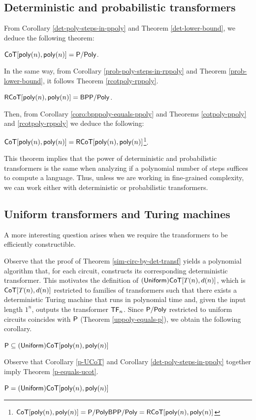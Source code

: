 \subsection{Deterministic and probabilistic transformers}

From Corollary \ref{det-poly-steps-in-ppoly} and Theorem \ref{det-lower-bound}, we deduce the following theorem:
%
\begin{theorem}\label{cotpoly-ppoly}
    $\mathsf{CoT}[\mathsf{poly}(n), \mathsf{poly}(n)] = \mathsf{P/Poly}$.
\end{theorem}
%
\noindent In the same way, from Corollary \ref{prob-poly-steps-in-rppoly} and Theorem \ref{prob-lower-bound}, it follows Theorem \ref{rcotpoly-rppoly}.
%
\begin{theorem}\label{rcotpoly-rppoly}
    $\mathsf{RCoT}[\mathsf{poly}(n), \mathsf{poly}(n)] = \mathsf{BPP/Poly}$.
\end{theorem}
%
\noindent Then, from Corollary \ref{coro:bpppoly-equals-ppoly} and Theorems \ref{cotpoly-ppoly} and \ref{rcotpoly-rppoly} we deduce the following:
%
\begin{theorem}\label{cotpoly-equals-rcotpoly}
    $\mathsf{CoT}[\mathsf{poly}(n), \mathsf{poly}(n)] = \mathsf{RCoT}[\mathsf{poly}(n), \mathsf{poly}(n)]$\footnote{$\mathsf{CoT}[\mathsf{poly}(n), \mathsf{poly}(n)] = \mathsf{P/Poly} \mathsf{BPP/Poly} = \mathsf{RCoT}[\mathsf{poly}(n), \mathsf{poly}(n)]$}.
\end{theorem}

This theorem implies that the power of deterministic and probabilistic transformers is the same when analyzing if a polynomial number of steps suffices to compute a language.
Thus, unless we are working in fine-grained complexity, we can work either with deterministic or probabilistic transformers.


\subsection{Uniform transformers and Turing machines}

A more interesting question arises when we require the transformers to be efficiently constructible.

Observe that the proof of Theorem \ref{sim-circ-by-det-transf} yields a polynomial algorithm that, for each circuit, constructs its corresponding deterministic transformer.
This motivates the definition of $\mathsf{(Uniform) CoT}[T(n), d(n)]$, which is $\mathsf{CoT}[T(n), d(n)]$ restricted to families of transformers such that there exists a deterministic Turing machine that runs in polynomial time and, given the input length $1^{n}$, outputs the transformer $\mathsf{TF}_n$.
Since $\mathsf{P/Poly}$ restricted to uniform circuits coincides with $\mathsf{P}$ (Theorem \ref{uppoly-equals-p}), we obtain the following corollary.
%
\begin{corollary}\label{p-UCoT}
    $\mathsf{P} \subseteq \mathsf{(Uniform) CoT}[\mathsf{poly}(n), \mathsf{poly}(n)]$
\end{corollary}
%
\noindent Observe that Corollary \ref{p-UCoT} and Corollary \ref{det-poly-steps-in-ppoly} together imply Theorem \ref{p-equals-ucot}.
%
\begin{theorem}\label{p-equals-ucot}
    $\mathsf{P} = \mathsf{(Uniform) CoT}[\mathsf{poly}(n), \mathsf{poly}(n)]$
\end{theorem}


